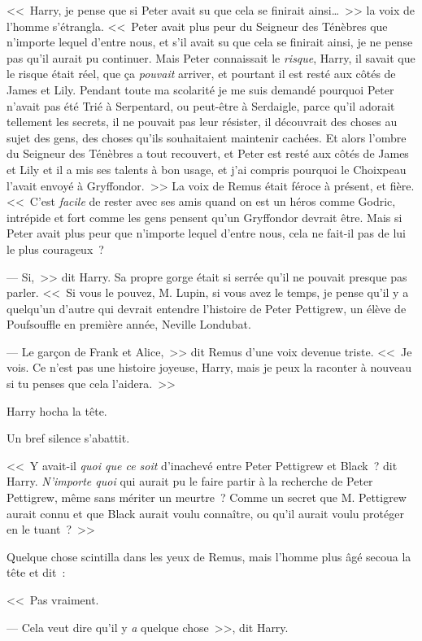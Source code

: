 <<~Harry, je pense que si Peter avait su que cela se finirait ainsi…~>> la voix de l'homme s'étrangla. <<~Peter avait plus peur du Seigneur des Ténèbres que n'importe lequel d'entre nous, et s'il avait su que cela se finirait ainsi, je ne pense pas qu'il aurait pu continuer. Mais Peter connaissait le \emph{risque}, Harry, il savait que le risque était réel, que ça \emph{pouvait} arriver, et pourtant il est resté aux côtés de James et Lily. Pendant toute ma scolarité je me suis demandé pourquoi Peter n'avait pas été Trié à Serpentard, ou peut-être à Serdaigle, parce qu'il adorait tellement les secrets, il ne pouvait pas leur résister, il découvrait des choses au sujet des gens, des choses qu'ils souhaitaient maintenir cachées. Et alors l'ombre du Seigneur des Ténèbres a tout recouvert, et Peter est resté aux côtés de James et Lily et il a mis ses talents à bon usage, et j'ai compris pourquoi le Choixpeau l'avait envoyé à Gryffondor.~>> La voix de Remus était féroce à présent, et fière. <<~C'est \emph{facile} de rester avec ses amis quand on est un héros comme Godric, intrépide et fort comme les gens pensent qu'un Gryffondor devrait être. Mais si Peter avait plus peur que n'importe lequel d'entre nous, cela ne fait-il pas de lui le plus courageux~?

--- Si,~>> dit Harry. Sa propre gorge était si serrée qu'il ne pouvait presque pas parler. <<~Si vous le pouvez, M. Lupin, si vous avez le temps, je pense qu'il y a quelqu'un d'autre qui devrait entendre l'histoire de Peter Pettigrew, un élève de Poufsouffle en première année, Neville Londubat.

--- Le garçon de Frank et Alice,~>> dit Remus d'une voix devenue triste. <<~Je vois. Ce n'est pas une histoire joyeuse, Harry, mais je peux la raconter à nouveau si tu penses que cela l'aidera.~>>

Harry hocha la tête.

Un bref silence s'abattit.

<<~Y avait-il \emph{quoi que ce soit} d'inachevé entre Peter Pettigrew et Black~? dit Harry. \emph{N'importe quoi} qui aurait pu le faire partir à la recherche de Peter Pettigrew, même sans mériter un meurtre~? Comme un secret que M. Pettigrew aurait connu et que Black aurait voulu connaître, ou qu'il aurait voulu protéger en le tuant~?~>>

Quelque chose scintilla dans les yeux de Remus, mais l'homme plus âgé secoua la tête et dit~:

<<~Pas vraiment.

--- Cela veut dire qu'il y \emph{a} quelque chose~>>, dit Harry.

